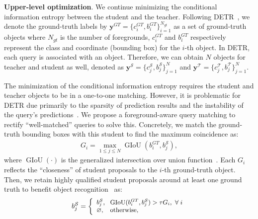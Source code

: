 \documentclass[10pt,twocolumn,letterpaper]{article}
\begin{document}
\textbf{Upper-level optimization}.
%
%
We continue minimizing the conditional information entropy between the student and the teacher. %
%
%
Following DETR~\cite{carion2020end}, we denote the ground-truth labels by $\bm{y}^{GT}=\{c^{GT}_i, b^{GT}_i\}_{i=1}^{N_{gt}}$ as a set of ground-truth objects where $N_{gt}$ is the number of foregrounds, $c_i^{GT}$ and $b_i^{GT}$ respectively represent the class and coordinate (bounding box) for the $i$-th object.
%
In DETR, each query is associated with an object. Therefore, we can obtain $N$ objects for teacher and student as well, denoted as $\bm{y}^{\mathcal{S}} = \{c^{\mathcal{S}}_j, b^{\mathcal{S}}_j\}_{j=1}^N$ and $\bm{y}^{\mathcal{T}} = \{c^{\mathcal{T}}_j, b^{\mathcal{T}}_j\}_{j=1}^N$.


%
%
The minimization of the conditional information entropy requires the student and teacher objects to be in a one-to-one matching. However, it is problematic for DETR due primarily to the sparsity of prediction results and the instability of the query’s predictions~\cite{li2022dn}. We propose a foreground-aware query matching to rectify ``well-matched'' queries to solve this.  Concretely, we match the ground-truth bounding boxes with this student to find the maximum coincidence as:
%
\begin{equation}
    \begin{aligned}
       G_i = \mathop{\max}_{1\leq j \leq N} \operatorname{GIoU}(b^{GT}_{i}, b^{\mathcal{S}}_{j}),
    \end{aligned}
    \label{eq:sigma}
\end{equation}
%
where $\operatorname{GIoU}(\cdot)$ is the generalized intersection over union function~\cite{rezatofighi2019generalized}. Each $G_i$ reflects the ``closeness'' of student proposals to the $i$-th ground-truth object.
%
Then, we retain highly qualified student proposals around at least one ground truth to benefit object recognition~\cite{wang2019distilling} as:
\begin{align}
\begin{split}
\small
b_j^{\mathcal{S}} = \left \{
\begin{array}{ll}
    {b}_j^{\mathcal{S}},         \!\!\!\! & {\operatorname{GIoU}}(b^{GT}_{i}, b^{\mathcal{S}}_{j}) > \tau G_i, \,\,\forall\; i  \\
    \varnothing,                                 & \text{otherwise},
\end{array}
\right.
\end{split}
\end{align}
\end{document}

